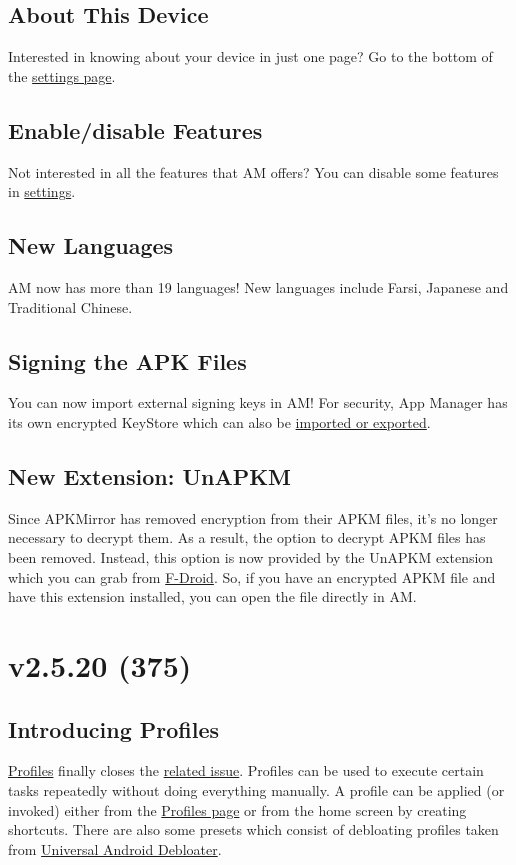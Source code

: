 \subsection{About This Device}
Interested in knowing about your device in just one page?
Go to the bottom of the \hyperref[subsec:device-info]{settings page}.

\subsection{Enable/disable Features}
Not interested in all the features that AM offers?
You can disable some features in \hyperref[subsubsec:enable/disable-features]{settings}.

\subsection{New Languages}
AM now has more than 19 languages!
New languages include Farsi, Japanese and Traditional Chinese.

\subsection{Signing the APK Files}
You can now import external signing keys in AM! For security, App Manager has its own encrypted KeyStore which can also be \hyperref[subsubsec:import/export-keystore]{imported or exported}.

\subsection{New Extension: UnAPKM}
Since APKMirror has removed encryption from their APKM files, it's no longer necessary to decrypt them.
As a result, the option to decrypt APKM files has been removed.
Instead, this option is now provided by the UnAPKM extension which you can grab from \href{https://f-droid.org/packages/io.github.muntashirakon.unapkm/}{F-Droid}.
So, if you have an encrypted APKM file and have this extension installed, you can open the file directly in AM\@.


\section{v2.5.20 (375)}\label{sec:v2.5.20-(375)}

\subsection{Introducing Profiles}\label{subsec:introducing-profiles}
\hyperref[sec:profile-page]{Profiles} finally closes the
\href{https://github.com/MuntashirAkon/AppManager/issues/72}{related issue}. Profiles can be used to execute certain
tasks repeatedly without doing everything manually. A profile can be applied (or invoked) either from the
\hyperref[sec:profiles-page]{Profiles page} or from the home screen by creating shortcuts. There are also some presets
which consist of debloating profiles taken from
\href{https://gitlab.com/W1nst0n/universal-android-debloater}{Universal Android Debloater}.

